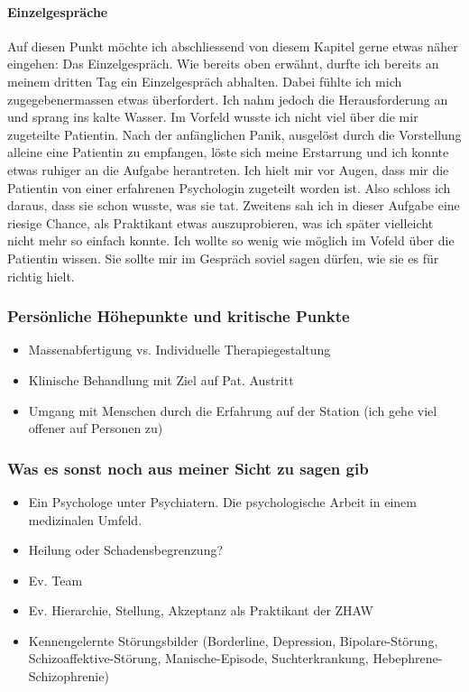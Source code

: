 \documentclass[jou,apacite]{apa6}
\begin{document}
\paragraph{Einzelgespräche}
Auf diesen Punkt möchte ich abschliessend von diesem Kapitel gerne etwas näher eingehen: Das Einzelgespräch. Wie bereits oben erwähnt, durfte ich bereits an meinem dritten Tag ein Einzelgespräch abhalten. Dabei fühlte ich mich zugegebenermassen etwas überfordert. Ich nahm jedoch die Herausforderung an und sprang ins kalte Wasser. Im Vorfeld wusste ich nicht viel über die mir zugeteilte Patientin. Nach der anfänglichen Panik, ausgelöst durch die Vorstellung alleine eine Patientin zu empfangen, löste sich meine Erstarrung und ich konnte etwas ruhiger an die Aufgabe herantreten. Ich hielt mir vor Augen, dass mir die Patientin von einer erfahrenen Psychologin zugeteilt worden ist. Also schloss ich daraus, dass sie schon wusste, was sie tat. Zweitens sah ich in dieser Aufgabe eine riesige Chance, als Praktikant etwas auszuprobieren, was ich später vielleicht nicht mehr so einfach konnte. Ich wollte so wenig wie möglich im Vofeld über die Patientin wissen. Sie sollte mir im Gespräch soviel sagen dürfen, wie sie es für richtig hielt. 

\subsubsection{Persönliche Höhepunkte und kritische Punkte} \label{sec:Höhepunkte}
\begin{itemize}
        \item Massenabfertigung vs. Individuelle Therapiegestaltung
        \item Klinische Behandlung mit Ziel auf Pat. Austritt
        \item Umgang mit Menschen durch die Erfahrung auf der Station (ich gehe viel offener auf Personen zu)
\end{itemize}
    
    
\subsubsection{Was es sonst noch aus meiner Sicht zu sagen gib}
\begin{itemize}
    \item Ein Psychologe unter Psychiatern. Die psychologische Arbeit in einem medizinalen Umfeld.
    \item Heilung oder Schadensbegrenzung?
    \item Ev. Team
    \item Ev. Hierarchie, Stellung, Akzeptanz als Praktikant der ZHAW
    \item Kennengelernte Störungsbilder (Borderline, Depression, Bipolare-Störung, Schizoaffektive-Störung, Manische-Episode, Suchterkrankung, Hebephrene-Schizophrenie)
\end{itemize}
\end{document}
